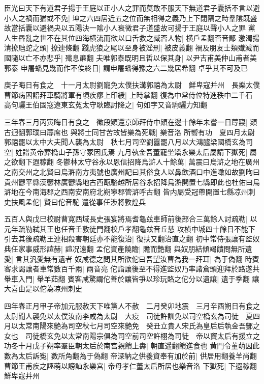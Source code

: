 臣光曰天下有道君子揚于王庭以正小人之罪而莫敢不服天下無道君子囊括不言以避小人之禍而猶或不免|{
	坤之六四居近五之位而無相得之義乃上下閉隔之時羣隂既盛故當括囊以避禍夬以五陽決一隂小人衰微君子道盛故可揚于王庭以聲小人之罪}
黨人生昬亂之世不在其位四海横流而欲以口舌救之臧否人物|{
	横戶孟翻否音鄙}
激濁揚清撩虺蛇之頭|{
	撩連條翻}
踐虎狼之尾以至身被淫刑|{
	被皮義翻}
禍及朋友士類殱滅而國隨以亡不亦悲乎|{
	殱息亷翻}
夫唯郭泰既明且哲以保其身|{
	以尹吉甫美仲山甫者美郭泰}
申屠蟠見幾而作不俟終日|{
	謂申屠蟠得豫之六二幾居希翻}
卓乎其不可及已

庚子晦日有食之　十一月太尉劉寵免太僕扶溝郭禧為太尉　鮮卑寇并州　長樂太僕曹節病困詔拜車騎將軍有頃疾瘳上印綬|{
	上時掌翻}
復為中常侍位特進秩中二千石　高句驪王伯固寇遼東玄菟太守耿臨討降之|{
	句如字又音駒驪力知翻}


三年春三月丙寅晦日有食之　徵段熲還京師拜侍中熲在邊十餘年未嘗一日蓐寢|{
	熲古迥翻郭璞曰蓐席也}
與將士同甘苦故皆樂為死戰|{
	樂音洛}
所嚮有功　夏四月太尉郭禧罷以太中大夫聞人襲為太尉　秋七月司空劉囂罷八月以大鴻臚梁國橋玄為司空|{
	姓譜黄帝葬橋山子孫守冢因氏焉}
九月執金吾董寵坐矯永樂太后屬請下獄死|{
	屬之欲翻下遐稼翻}
冬鬱林太守谷永以恩信招降烏滸人十餘萬|{
	萬震曰烏滸之地在廣州之南交州之北賢曰烏滸南方夷號也廣州記曰其俗食人以鼻飲酒口中進噉如故劉昫曰貴州鬱平縣漢鬱林廣鬱縣地古西甌駱越所居谷永招降烏滸開置七縣即此也杜佑曰烏滸地在今南海郡之西南安南府北朔寧郡管滸呼古翻}
皆内屬受冠帶開置七縣凉州刺史扶風孟佗|{
	賢曰佗音駝}
遣從事任涉將敦煌兵

五百人與戊巳校尉曹寛西域長史張宴將焉耆龜兹車師前後部合三萬餘人討疏勒|{
	以元年疏勒弑其王也任音壬敦徒門翻校戶孝翻龜兹音丘慈}
攻楨中城四十餘日不能下引去其後疏勒王連相殺害朝廷亦不能復治|{
	復扶又翻治直之翻}
初中常侍張讓有監奴典任家事威形諠赫|{
	諠况遠翻}
孟佗資產饒贍|{
	贍而艶翻}
與奴朋結傾竭饋問無所遺愛|{
	言其汎愛無有遺者}
奴咸德之問其所欲佗曰吾望汝曹為我一拜耳|{
	為于偽翻}
時賓客求謁讓者車常數百千兩|{
	兩音亮}
佗詣讓後至不得進監奴乃率諸倉頭迎拜於路遂共轝車入門|{
	轝羊茹翻}
賓客咸驚謂佗善於讓皆爭以珍玩賂之佗分以遺讓|{
	遺于季翻}
讓大喜由是以佗為凉州刺史

四年春正月甲子帝加元服赦天下唯黨人不赦　二月癸卯地震　三月辛酉朔日有食之　太尉聞人襲免以太僕汝南李咸為太尉　大疫　司徒許訓免以司空橋玄為司徒　夏四月以太常南陽來艶為司空秋七月司空來艶免　癸丑立貴人宋氏為皇后后執金吾酆之女也　司徒橋玄免以太常南陽宗俱為司空前司空許栩為司徒　帝以竇太后有援立之功冬十月戊子朔率羣臣朝太后於南宫親饋上夀|{
	朝直遥翻饋進食也}
黄門令董萌因此數為太后訴寃|{
	數所角翻為于偽翻}
帝深納之供養資奉有加於前|{
	供居用翻養羊尚翻}
曹節王甫疾之誣萌以謗訕永樂宫|{
	帝母孝仁董太后所居也樂音洛}
下獄死|{
	下遐稼翻}
鮮卑寇并州

